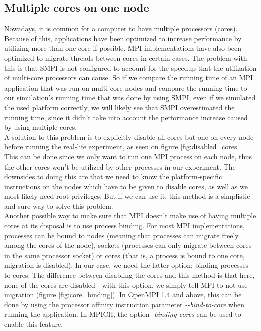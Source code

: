 \subsection{Multiple cores on one node}
\label{sec:multiple_cores}
Nowadays, it is common for a computer to have multiple processors
(cores). Because of this, applications have been optimized to increase
performance by utilizing more than one core if possible. MPI
implementations have
also been optimized to migrate threads between cores in certain
cases. The problem with this is that SMPI is not configured to account
for the speedup that the utilization of multi-core processors can
cause. So if we compare the running time of an MPI application that
was run on multi-core nodes and compare the running time to our
simulation's running time that was done by using SMPI, even if we
simulated the used platform correctly, we will likely see that SMPI
overestimated the running time, since it didn't take into account the
performance increase caused by using multiple cores.\\
A solution to this problem is to explicitly disable all cores
but one on every node before running the real-life experiment, as seen
on figure \ref{fig:disabled_cores}.\cite{ms11} This can be done since
we only want to run one MPI process on each node, thus the other cores
won't be utilized by other processes in our experiment. The downsides
to doing this are that we need to know the platform-specific
instructions on the nodes which have to be given to disable cores, as
well as we most likely need root privileges. But if we can use it,
this method is a simplistic and sure way to solve this problem.\\
Another possible way to make sure that MPI doesn't make use of having
multiple cores at its disposal is to use process binding. For most MPI
implementations, processes can be bound to nodes (meaning that
processes can migrate freely among the cores of the node), sockets
(processes can only migrate between cores in the same processor
socket) or cores (that is, a process is bound to one core, migration
is disabled). In our case, we need the latter option: binding
processes to cores. The difference between disabling the cores and
this method is that here, none of the cores are disabled - with this
option, we simply tell MPI to not use migration (figure
\ref{fig:core_binding}). In OpenMPI 1.4 and above, this can be done by
using the processor affinity instruction parameter
\emph{-{}-bind-to-core} when running the application. In MPICH,
the option \emph{-binding cores} can be used to enable this feature.
